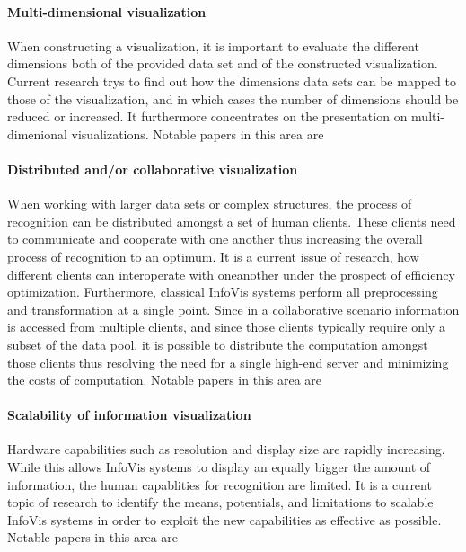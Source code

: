 \paragraph{Multi-dimensional visualization}
When constructing a visualization, it is important to evaluate the different dimensions both of the provided data set and of the constructed visualization. Current research trys to find out how the dimensions data sets can be mapped to those of the visualization, and in which cases the number of dimensions should be reduced or increased. It furthermore concentrates on the presentation on multi-dimenional visualizations. Notable papers in this area are \cite{research:dimensions:hanson, research:dimensions:yang, research:dimensions:riazati, research:dimensions:peng, research:dimensions:artero}

\paragraph{Distributed and/or collaborative visualization}
When working with larger data sets or complex structures, the process of recognition can be distributed amongst a set of human clients. These clients need to communicate and cooperate with one another thus increasing the overall process of recognition to an optimum. It is a current issue of research, how different clients can interoperate with oneanother under the prospect of efficiency optimization. Furthermore, classical InfoVis systems perform all preprocessing and transformation at a single point. Since in a collaborative scenario information is accessed from multiple clients, and since those clients typically require only a subset of the data pool, it is possible to distribute the computation amongst those clients thus resolving the need for a single high-end server and minimizing the costs of computation. Notable papers in this area are \cite{research:collaborative:zhao, research:collaborative:anupam, research:collaborative:heer, research:collaborative:johnson, research:collaborative:balakrishnan, research:collaborative:bajaj}

\paragraph{Scalability of information visualization}
Hardware capabilities such as resolution and display size are rapidly increasing. While this allows InfoVis systems to display an equally bigger the amount of information, the human capablities for recognition are limited. It is a current topic of research to identify the means, potentials, and limitations to scalable InfoVis systems in order to exploit the new capabilities as effective as possible. Notable papers in this area are \cite{research:scalability:yost, research:scalability:ball}


